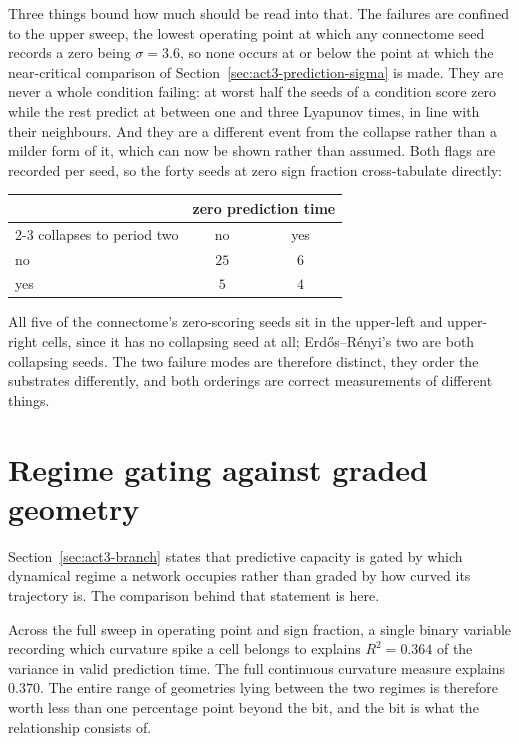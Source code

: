 Three things bound how much should be read into that. The failures are confined
to the upper sweep, the lowest operating point at which any connectome seed
records a zero being
$\sigma = 3.6$, %
so none occurs at or below the point at which the near-critical comparison of
Section~\ref{sec:act3-prediction-sigma} is made. They are never a whole
condition failing: at worst half the seeds of a condition score zero while the
rest predict at between one and three Lyapunov times, in line with their
neighbours. And they are a different event from the collapse rather than a
milder form of it, which can now be shown rather than assumed. Both flags are
recorded per seed, so the forty seeds at zero sign fraction cross-tabulate
directly:

\begin{center}
\begin{tabular}{lcc}
    \toprule
    & \multicolumn{2}{c}{zero prediction time} \\
    \cmidrule(lr){2-3}
    collapses to period two & no & yes \\
    \midrule
    no  & $25$ & $6$ \\
    yes & $5$  & $4$ \\
    \bottomrule
\end{tabular}
\end{center}

All five of the connectome's zero-scoring seeds sit in the upper-left and
upper-right cells, since it has no collapsing seed at all; Erdős--Rényi's two
are both collapsing seeds. The two failure modes are therefore distinct, they
order the substrates differently, and both orderings are correct measurements of
different things.


\section{Regime gating against graded geometry}
\label{app:regime-gating}
\bigskip

Section~\ref{sec:act3-branch} states that predictive capacity is gated by which
dynamical regime a network occupies rather than graded by how curved its
trajectory is. The comparison behind that statement is here.

Across the full sweep in operating point and sign fraction, a single binary
variable recording which curvature spike a cell belongs to explains
$R^2 = 0.364$ %
of the variance in valid prediction time. The full continuous curvature measure
explains
$0.370$. %
The entire range of geometries lying between the two regimes is therefore worth
less than one percentage point beyond the bit, and the bit is what the
relationship consists of.

